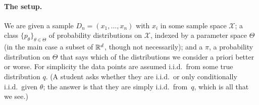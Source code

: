 \paragraph{The setup.}
We are given a sample $D_n=(x_1,\dots,x_n)$ with $x_i$ in some sample space $\mathcal X$; a class $\{p_\theta\}_{\theta\in\Theta}$ of probability distributions on $\mathcal X$, indexed by a parameter space $\Theta$ (in the main case a subset of $\mathbb{R}^d$, though not necessarily); and a  $\pi$, a probability distribution on $\Theta$ that says which of the distributions we consider a priori better or worse. For simplicity the data points are assumed i.i.d.\ from some true distribution $q$. (A student asks whether they are i.i.d.\ or only conditionally i.i.d.\ given $\theta$; the answer is that they are simply i.i.d.\ from~$q$, which is all that we see.)

